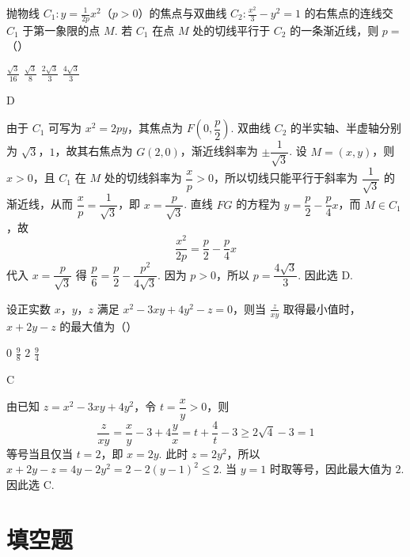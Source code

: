 \begin{problem}
抛物线 \(C_1: y = \frac{1}{2p} x^2\)（\(p > 0\)）的焦点与双曲线 \(C_2: \frac{x^2}{3} - y^2 = 1\) 的右焦点的连线交 \(C_1\) 于第一象限的点 \(M\). 若 \(C_1\) 在点 \(M\) 处的切线平行于 \(C_2\) 的一条渐近线，则 \(p =\)（\quad）

\choices
    {\(\frac{\sqrt{3}}{16}\)}
    {\(\frac{\sqrt{3}}{8}\)}
    {\(\frac{2\sqrt{3}}{3}\)}
    {\(\frac{4\sqrt{3}}{3}\)}
\end{problem}

\begin{answer}
D
\end{answer}

\begin{solution}
由于 \(C_1\) 可写为 \(x^2=2py\)，其焦点为 \(F\left(0,\dfrac{p}{2}\right)\). 双曲线 \(C_2\) 的半实轴、半虚轴分别为 \(\sqrt{3}\)，\(1\)，故其右焦点为 \(G(2,0)\)，渐近线斜率为 \(\pm\dfrac{1}{\sqrt{3}}\). 设 \(M=(x,y)\)，则 \(x>0\)，且 \(C_1\) 在 \(M\) 处的切线斜率为 \(\dfrac{x}{p}>0\)，所以切线只能平行于斜率为 \(\dfrac{1}{\sqrt{3}}\) 的渐近线，从而 \(\dfrac{x}{p}=\dfrac{1}{\sqrt{3}}\)，即 \(x=\dfrac{p}{\sqrt{3}}\). 直线 \(FG\) 的方程为 \(y=\dfrac{p}{2}-\dfrac{p}{4}x\)，而 \(M\in C_1\)，故
\[
\frac{x^2}{2p}=\frac{p}{2}-\frac{p}{4}x
\]
代入 \(x=\dfrac{p}{\sqrt{3}}\) 得 \(\dfrac{p}{6}=\dfrac{p}{2}-\dfrac{p^2}{4\sqrt{3}}\). 因为 \(p>0\)，所以 \(p=\dfrac{4\sqrt{3}}{3}\). 因此选 D.
\end{solution}

\begin{problem}
设正实数 \(x\)，\(y\)，\(z\) 满足 \(x^2 - 3xy + 4y^2 - z = 0\)，则当 \(\frac{z}{xy}\) 取得最小值时，\(x + 2y - z\) 的最大值为（\quad）

\choices
    {\(0\)}
    {\(\frac{9}{8}\)}
    {\(2\)}
    {\(\frac{9}{4}\)}
\end{problem}

\begin{answer}
C
\end{answer}

\begin{solution}
由已知 \(z=x^2-3xy+4y^2\)，令 \(t=\dfrac{x}{y}>0\)，则
\[
\frac{z}{xy}=\frac{x}{y}-3+4\frac{y}{x}=t+\frac{4}{t}-3\geqslant2\sqrt{4}-3=1
\]
等号当且仅当 \(t=2\)，即 \(x=2y\). 此时 \(z=2y^2\)，所以
\(x+2y-z=4y-2y^2=2-2(y-1)^2\leqslant2\). 当 \(y=1\) 时取等号，因此最大值为 \(2\). 因此选 C.
\end{solution}

\section{填空题}

